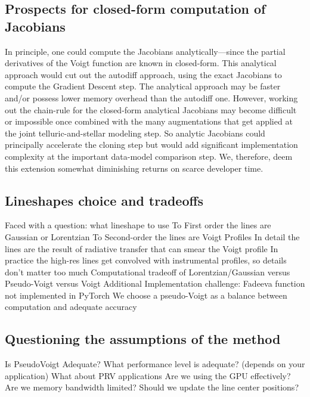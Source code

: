 \documentclass[modern]{aastex631}
\begin{document}
\subsection{Prospects for closed-form computation of Jacobians}
In principle, one could compute the Jacobians analytically---since the partial derivatives of the Voigt function are known in closed-form.  This analytical approach would cut out the autodiff approach, using the exact Jacobians to compute the Gradient Descent step.  The analytical approach may be faster and/or possess lower memory overhead than the autodiff one.  However, working out the chain-rule for the closed-form analytical Jacobians may become difficult or impossible once combined with the many augmentations that get applied at the joint telluric-and-stellar modeling step.  So analytic Jacobians could principally accelerate the cloning step but would add significant implementation complexity at the important data-model comparison step.  We, therefore, deem this extension somewhat diminishing returns on scarce developer time.


\subsection{Lineshapes choice and tradeoffs}
\begin{outline}
    \1 Faced with a question: what lineshape to use
    \2 To First order the lines are Gaussian or Lorentzian
    \2 To Second-order the lines are Voigt Profiles
    \2 In detail the lines are the result of radiative transfer that can smear the Voigt profile
    \2 In practice the high-res lines get convolved with instrumental profiles, so details don't matter too much
    \1 Computational tradeoff of Lorentzian/Gaussian versus Pseudo-Voigt versus Voigt
    \2 Additional Implementation challenge: Fadeeva function not implemented in PyTorch
    \1 We choose a pseudo-Voigt as a balance between computation and adequate accuracy
\end{outline}

\subsection{Questioning the assumptions of the method}

\begin{outline}
    \1 Is PseudoVoigt Adequate?
    \1 What performance level is adequate? (depends on your application)
    \1 What about PRV applications
    \1 Are we using the GPU effectively? Are we memory bandwidth limited?
    \1 Should we update the line center positions?
\end{outline}
\end{document}
